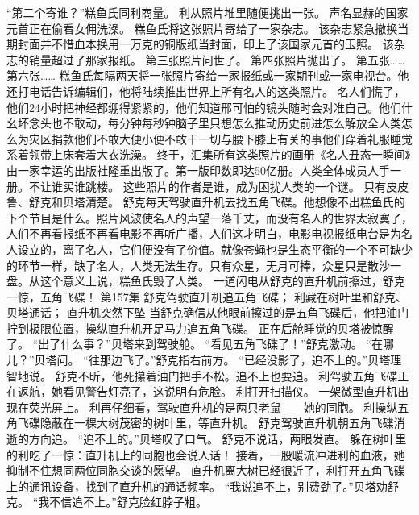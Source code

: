 \documentclass[a4paper,12pt,UTF8,twoside]{ctexbook}
\begin{document}
        “第二个寄谁？”糕鱼氏同利商量。 
        利从照片堆里随便挑出一张。 
        声名显赫的国家元首正在偷看女佣洗澡。 
        糕鱼氏将这张照片寄给了一家杂志。 
        该杂志紧急撤换当期封面并不惜血本换用一万克的铜版纸当封面，印上了该国家元首的玉照。 
        该杂志的销量超过了那家报纸。 
        第三张照片问世了。 
        第四张照片抛出了。 
        第五张…… 
        第六张…… 
        糕鱼氏每隔两天将一张照片寄给一家报纸或一家期刊或一家电视台。他还打电话告诉编辑们，他将陆续推出世界上所有名人的这类照片。 
        名人们慌了，他们24小时把神经都绷得紧紧的，他们知道邢可怕的镜头随时会对准自己。他们什幺坏念头也不敢动，每分钟每秒钟脑子里只想怎么推动历史前进怎么解放全人类怎么为灾区捐款他们不敢大便小便不敢干一切与腰下膝上有关的事他们穿着礼服睡觉系着领带上床套着大衣洗澡。 
        终于，汇集所有这类照片的画册《名人丑态一瞬间》由一家幸运的出版社隆重出版了。第一版印数即达50亿册。人类全体成员人手一册。不让谁买谁跳楼。 
        这些照片的作者是谁，成为困扰人类的一个谜。 
        只有皮皮鲁、舒克和贝塔清楚。 
        舒克每天驾驶直升机去找五角飞碟。他想像不出糕鱼氏的下个节目是什么。照片风波使名人的声望一落千丈，而没有名人的世界太寂寞了，人们不再看报纸不再看电影不再听广播，人们这才明白，电影电视报纸电台是为名人设立的，离了名人，它们便没有了价值。就像苍蝇也是生态平衡的一个不可缺少的环节一样，缺了名人，人类无法生存。只有众星，无月可捧，众星只是散沙一盘。从这个意义上说，糕鱼氏毁了人类。 
        一道闪电从舒克的直升机前擦过，舒克一惊，五角飞碟！   第157集 
        舒克驾驶直升机追五角飞碟； 
        利藏在树叶里和舒克、贝塔通话； 
        直升机突然下坠   
        当舒克确信从他眼前擦过的是五角飞碟后，他把油门拧到极限位置，操纵直升机开足马力追五角飞碟。 
        正在后舱睡觉的贝塔被惊醒了。 
        “出了什么事？”贝塔来到驾驶舱。 
        “看见五角飞碟了！”舒克激动。 
        “在哪儿？”贝塔问。 
        “往那边飞了。”舒克指右前方。 
        “已经没影了，追不上的。”贝塔理智地说。 
        舒克不昕，他死攥着油门把手不松。追不上也要追。 
        利驾驶五角飞碟正在返航，她看见警告灯亮了，这说明有危脸。 
        利打开扫描仪。 
        一架微型直升机出现在荧光屏上。 
        利再仔细看，驾驶直升机的是两只老鼠——她的同胞。 
        利操纵五角飞碟隐蔽在一棵大树茂密的树叶里，等直升机。 
        舒克驾驶直升机朝五角飞碟消逝的方向追。 
        “追不上的。”贝塔叹了口气。 
        舒克不说话，两眼发直。 
        躲在树叶里的利吃了一惊：直升机上的同胞也会说人话！ 
        接着，一股暖流冲进利的血液，她抑制不住想同两位同胞交谈的愿望。 
        直升机离大树已经很近了，利打开五角飞碟上的通讯设备，找到了直升机的通话频率。 
        “我说追不上，别费劲了。”贝塔劝舒克。 
        “我不信追不上。”舒克脸红脖子粗。 
\end{document}

